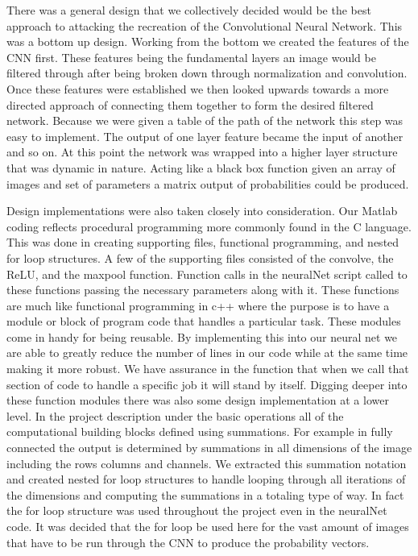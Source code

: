 \documentclass[11pt,english]{article}
\begin{document}
There was a general design that we collectively decided would be the best approach to attacking the recreation of the Convolutional Neural Network. This was a bottom up design. Working from the bottom we created the features of the CNN first.  These features being the fundamental layers an image would be filtered through after being broken down through normalization and convolution.  Once these features were established we then looked upwards towards a more directed approach of connecting them together to form the desired filtered network. Because we were given a table of the path of the network this step was easy to implement. The output of one layer feature became the input of another and so on. At this point the network was wrapped into a higher layer structure that was dynamic in nature.  Acting like a black box function given an array of images and set of parameters a matrix output of probabilities could be produced.  

Design implementations were also taken closely into consideration. Our Matlab coding reflects procedural programming more commonly found in the C language. This was done in creating supporting files, functional programming, and nested for loop structures.  A few of the supporting files consisted of the convolve, the ReLU, and the maxpool function. Function calls in the neuralNet script called to these functions passing the necessary parameters along with it. These functions are much like functional programming in c++ where the purpose is to have a module or block of program code that handles a particular task.  These modules come in handy for being reusable.  By implementing this into our neural net we are able to greatly reduce the number of lines in our code while at the same time making it more robust. We have assurance in the function that when we call that section of code to handle a specific job it will stand by itself.  Digging deeper into these function modules there was also some design implementation at a lower level.  In the project description under the basic operations all of the computational building blocks defined using summations. For example in fully connected the output is determined by summations in all dimensions of the image including the rows columns and channels. We extracted this summation notation and created nested for loop structures to handle looping through all iterations of the dimensions and computing the summations in a totaling type of way. In fact the for loop structure was used throughout the project even in the neuralNet code.  It was decided that the for loop be used here for the vast amount of images that have to be run through the CNN to produce the probability vectors. 
\end{document}
